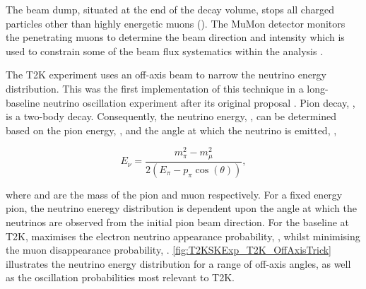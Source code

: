 The beam dump, situated at the end of the decay volume, stops all charged particles other than highly energetic muons (). The MuMon detector monitors the penetrating muons to determine the beam direction and intensity which is used to constrain some of the beam flux systematics within the analysis \cite{MuMon, Vladisavljevic2020-gv}. 

The T2K experiment uses an off-axis beam to narrow the neutrino energy distribution. This was the first implementation of this technique in a long-baseline neutrino oscillation experiment after its original proposal \cite{Beavis1995-qf}. Pion decay, \quickmath{\pi \rightarrow \mu + \nu_\mu}, is a two-body decay. Consequently, the neutrino energy, , can be determined based on the pion energy, , and the angle at which the neutrino is emitted, \quickmath{\theta},

\begin{equation}
  E_\nu = \frac{m^{2}_{\pi} - m^{2}_{\mu}}{2\left(E_\pi - p_\pi \cos(\theta) \right)},
\end{equation}

where  and  are the mass of the pion and muon respectively. For a fixed energy pion, the neutrino eneregy distribution is dependent upon the angle at which the neutrinos are observed from the initial pion beam direction. For the  baseline at T2K,  maximises the electron neutrino appearance probability, , whilst minimising the muon disappearance probability, . \autoref{fig:T2KSKExp_T2K_OffAxisTrick} illustrates the neutrino energy distribution for a range of off-axis angles, as well as the oscillation probabilities most relevant to T2K.

